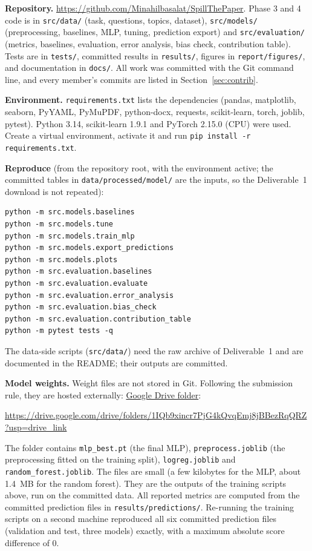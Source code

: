 \documentclass[11pt,a4paper]{article}
\newcommand{\weightsurl}{https://drive.google.com/drive/folders/1IQb9xincr7PjG4kQvqEmj8jBBezRqQRZ?usp=drive_link}
\begin{document}
\textbf{Repository.} \url{https://github.com/Minahilbasalat/SpillThePaper}. Phase 3 and 4 code is in \texttt{src/data/} (task,
questions, topics, dataset), \texttt{src/models/} (preprocessing, baselines, MLP, tuning, prediction export) and
\texttt{src/evaluation/} (metrics, baselines, evaluation, error analysis, bias check, contribution table). Tests are in
\texttt{tests/}, committed results in \texttt{results/}, figures in \texttt{report/figures/}, and documentation in
\texttt{docs/}. All work was committed with the Git command line, and every member's commits are listed in
Section~\ref{sec:contrib}.

\textbf{Environment.} \texttt{requirements.txt} lists the dependencies (pandas, matplotlib, seaborn, PyYAML, PyMuPDF,
python-docx, requests, scikit-learn, torch, joblib, pytest). Python 3.14, scikit-learn 1.9.1 and PyTorch 2.15.0 (CPU) were used.
Create a virtual environment, activate it and run \texttt{pip install -r requirements.txt}.

\textbf{Reproduce} (from the repository root, with the environment active; the committed tables in \texttt{data/processed/model/}
are the inputs, so the Deliverable~1 download is not repeated):
\begin{small}
\begin{verbatim}
python -m src.models.baselines
python -m src.models.tune
python -m src.models.train_mlp
python -m src.models.export_predictions
python -m src.models.plots
python -m src.evaluation.baselines
python -m src.evaluation.evaluate
python -m src.evaluation.error_analysis
python -m src.evaluation.bias_check
python -m src.evaluation.contribution_table
python -m pytest tests -q
\end{verbatim}
\end{small}
The data-side scripts (\texttt{src/data/}) need the raw archive of Deliverable~1 and are documented in the README; their
outputs are committed.

\textbf{Model weights.} Weight files are not stored in Git. Following the submission rule, they are hosted externally:
\href{\weightsurl}{Google Drive folder}:
\begin{center}\small\expandafter\url\expandafter{\weightsurl}\end{center}
The folder contains
\texttt{mlp\_best.pt} (the final MLP), \texttt{preprocess.joblib} (the preprocessing fitted on the training split),
\texttt{logreg.joblib} and \texttt{random\_forest.joblib}. The files are small (a few kilobytes for the MLP, about 1.4~MB for
the random forest). They are the outputs of the training scripts above, run on the committed data. All reported metrics are computed from the
committed prediction files in \texttt{results/predictions/}. Re-running the training scripts on a second machine reproduced all six committed prediction files (validation and test, three models) exactly, with a maximum absolute score difference of 0.
\end{document}
